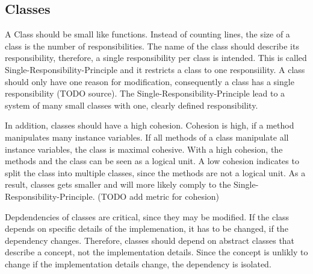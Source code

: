 \subsection{Classes}
A Class should be small like functions. Instead of counting lines, the size of a class is the number of responsibilities. The name of the class should describe its responsibility, therefore, a single responsibility per class is intended. This is called Single-Responsibility-Principle and it restricts a class to one responsiility. A class should only have one reason for modification, consequently a class has a single responsibility (TODO source). The Single-Responsibility-Principle lead to a system of many small classes with one, clearly defined responsibility.

In addition, classes should have a high cohesion. Cohesion is high, if a method manipulates many instance variables. If all methods of a class manipulate all instance variables, the class is maximal cohesive. With a high cohesion, the methods and the class can be seen as a logical unit. A low cohesion indicates to split the class into multiple classes, since the methods are not a logical unit. As a result, classes gets smaller and will more likely comply to the Single-Responsibility-Principle. (TODO add metric for cohesion)

Depdendencies of classes are critical, since they may be modified. If the class depends on specific details of the implemenation, it has to be changed, if the dependency changes. Therefore, classes should depend on abstract classes that describe a concept, not the implementation details. Since the concept is unlikly to change if the implementation details change, the dependency is isolated. 

